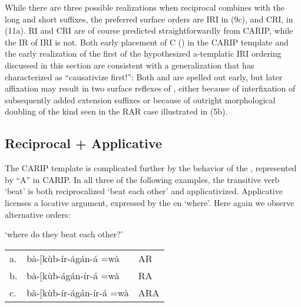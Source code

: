 \documentclass[output=paper,
modfonts
]{LSP/langsci}
\begin{document}
While there are three possible realizations when reciprocal
 combines with the long and short  suffixes, the
preferred surface orders are IRI in (9c), and CRI, in (11a). RI and CRI
are of course predicted straightforwardly from CARIP, while the IR of
IRI is not. Both early placement of C () in the CARIP
template and the early realization of the first  of the
hypothesized a-templatic IRI ordering discussed in this section are
consistent with a generalization that \citet[272]{hyman2003} has
characterized as ``causativize first!'': Both  and 
are spelled out early, but later affixation may result in two surface
reflexes of , either because of interfixation of subsequently
added extension suffixes or because of outright morphological 
doubling of the kind seen in the  RAR case illustrated in (5b).

\subsection{Reciprocal + Applicative}

The CARIP template is complicated further by the behavior of the
, represented by ``A'' in CARIP. In all three of the following
examples, the transitive verb  `beat' is both reciprocalized
`beat each other' and applicativized. Applicative  licenses a
locative argument, expressed by the en  `where'. Here
again we observe alternative  orders:

\ea \label{ex:hyman:13}`where do they beat each other?'\\
\begin{tabular}{@{}lll@{}}
a. & bà-{[}kùb-ír-ágán-á =wà & AR  \\
b. & bà-{[}kùb-ágán-ír-á =wà & RA \\
c. & bà-{[}kùb-ír-ágán-ír-á =wà & ARA \\
\end{tabular}
\z
\end{document}
